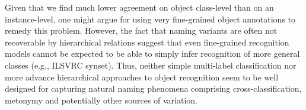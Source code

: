 Given that we find much lower agreement on object class-level than on an instance-level, one might argue for using very fine-grained object annotations to remedy this problem. 
However, the fact that naming variants are often not recoverable by hierarchical relations suggest that even fine-grained recognition models cannot be expected to be able to simply infer recognition of more general classes (e.g., ILSVRC synset). Thus, neither simple multi-label classification nor more advance hierarchical approaches to object recognition seem to be well designed for capturing natural naming phenomena comprising cross-classification, metonymy and potentially other sources of variation.





